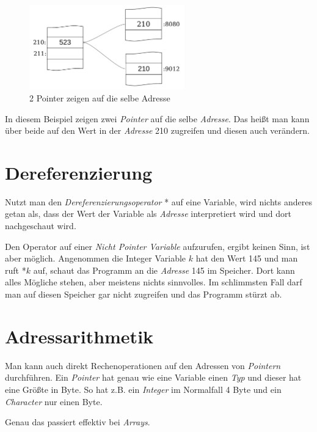 \documentclass[c_worksheet.tex]{subfiles}
\begin{document}
\begin{figure}[h]
\centering
\includegraphics[width=0.6\textwidth]{Grafiken/Pointer/2pointer}
\caption{2 Pointer zeigen auf die selbe Adresse} 
\end{figure}

In diesem Beispiel zeigen zwei \emph{Pointer} auf die selbe \emph{Adresse}. Das heißt man kann über beide auf den Wert in der \emph{Adresse} 210 zugreifen und diesen auch verändern.

 



\section{Dereferenzierung}

Nutzt man den \emph{Dereferenzierungsoperator} * auf eine Variable, wird nichts anderes getan als, dass der Wert der Variable als \emph{Adresse} interpretiert wird und dort nachgeschaut wird. 

Den Operator auf einer \emph{Nicht Pointer Variable} aufzurufen, ergibt keinen Sinn, ist aber möglich. Angenommen die Integer Variable \(k\) hat den Wert 145 und man ruft *\(k\) auf, schaut das Programm an die \emph{Adresse} 145 im Speicher. Dort kann alles Mögliche stehen, aber meistens nichts sinnvolles. Im schlimmsten Fall darf man auf diesen Speicher gar nicht zugreifen und das Programm stürzt ab.



\section{Adressarithmetik}

Man kann auch direkt Rechenoperationen auf den Adressen von \emph{Pointern} durchführen. Ein \emph{Pointer} hat genau wie eine Variable einen \emph{Typ} und dieser hat eine Größte in Byte. So hat z.B. ein \emph{Integer} im Normalfall 4 Byte und ein \emph{Character} nur einen Byte.

 

Genau das passiert effektiv bei \emph{Arrays}.
\end{document}
